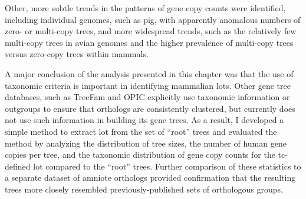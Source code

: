 Other, more subtle trends in the patterns of gene copy counts were
identified, including individual genomes, such as pig, with apparently
anomalous numbers of zero- or multi-copy trees, and more widespread
trends, such as the relatively few multi-copy trees in avian genomes
and the higher prevalence of multi-copy trees versus zero-copy trees
within mammals.

A major conclusion of the analysis presented in this chapter was that
the use of taxonomic criteria is important in identifying mammalian
\acp{lot}. Other gene tree databases, such as TreeFam
\citep{Ruan2008} and OPIC \citep{Heger2008} explicitly use taxonomic
information or outgroups to ensure that orthologs are consistently
clustered, but \cmp currently does not use such information in
building its gene trees. As a result, I developed a simple method to
extract \ac{lot} from the set of ``root'' \cmp trees and evaluated the
method by analyzing the distribution of tree sizes, the number of
human gene copies per tree, and the taxonomic distribution of gene
copy counts for the \ac{tc}-defined \ac{lot} compared to the ``root''
\cmp trees. Further comparison of these statistics to a separate
dataset of amniote orthologs provided confirmation that the resulting
trees more closely resembled previously-published sets of orthologous
groups.

